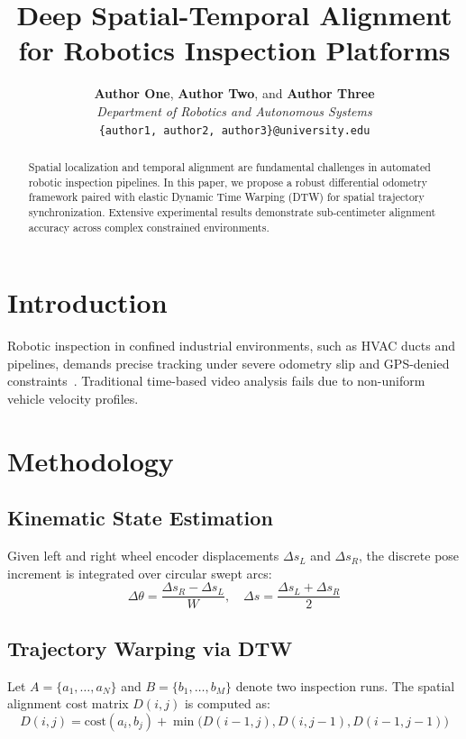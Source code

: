 \documentclass[10pt,journal,compsoc,twocolumn]{article}
\title{\textbf{\Large Deep Spatial-Temporal Alignment for Robotics Inspection Platforms}}
\author{
    \textbf{Author One}, \textbf{Author Two}, and \textbf{Author Three} \\
    \textit{Department of Robotics and Autonomous Systems} \\
    \texttt{\{author1, author2, author3\}@university.edu}
}
\date{}
\begin{document}
\maketitle

\begin{abstract}
Spatial localization and temporal alignment are fundamental challenges in automated robotic inspection pipelines. In this paper, we propose a robust differential odometry framework paired with elastic Dynamic Time Warping (DTW) for spatial trajectory synchronization. Extensive experimental results demonstrate sub-centimeter alignment accuracy across complex constrained environments.
\end{abstract}

\section{Introduction}
Robotic inspection in confined industrial environments, such as HVAC ducts and pipelines, demands precise tracking under severe odometry slip and GPS-denied constraints~\cite{smith2024robotics}. Traditional time-based video analysis fails due to non-uniform vehicle velocity profiles.

\section{Methodology}
\subsection{Kinematic State Estimation}
Given left and right wheel encoder displacements $\Delta s_L$ and $\Delta s_R$, the discrete pose increment is integrated over circular swept arcs:
\begin{equation}
\Delta \theta = \frac{\Delta s_R - \Delta s_L}{W}, \quad \Delta s = \frac{\Delta s_L + \Delta s_R}{2}
\end{equation}

\subsection{Trajectory Warping via DTW}
Let $A = \{a_1, \dots, a_N\}$ and $B = \{b_1, \dots, b_M\}$ denote two inspection runs. The spatial alignment cost matrix $D(i, j)$ is computed as:
\begin{equation}
D(i, j) = \text{cost}(a_i, b_j) + \min\big(D(i-1, j), D(i, j-1), D(i-1, j-1)\big)
\end{equation}
\end{document}
